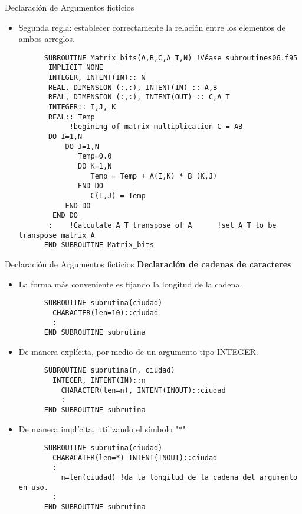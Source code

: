 \begin{frame}[fragile]{Declaración de Argumentos ficticios}
 \begin{itemize}[<+(0)->]
 \item Segunda regla: establecer correctamente la relación entre los elementos de ambos arreglos.
  \vspace{0.15cm}
      \begin{verbatim}
      SUBROUTINE Matrix_bits(A,B,C,A_T,N) !Véase subroutines06.f95
       IMPLICIT NONE
       INTEGER, INTENT(IN):: N
       REAL, DIMENSION (:,:), INTENT(IN) :: A,B
       REAL, DIMENSION (:,:), INTENT(OUT) :: C,A_T
       INTEGER:: I,J, K
       REAL:: Temp
            !begining of matrix multiplication C = AB  
       DO I=1,N                         
           DO J=1,N
              Temp=0.0
              DO K=1,N
                 Temp = Temp + A(I,K) * B (K,J)
              END DO
                 C(I,J) = Temp
           END DO
        END DO
       :    !Calculate A_T transpose of A      !set A_T to be transpose matrix A
      END SUBROUTINE Matrix_bits
      \end{verbatim} 
 \end{itemize}
\end{frame} 

\begin{frame}[fragile]{Declaración de Argumentos ficticios}
\textbf{Declaración de cadenas de caracteres}
 \begin{itemize}[<+(1)->]
  \item La forma más conveniente es fijando la longitud de la cadena.
   \vspace{0.15cm}
      \begin{verbatim}
      SUBROUTINE subrutina(ciudad)
        CHARACTER(len=10)::ciudad
        :
      END SUBROUTINE subrutina
      \end{verbatim} 
  \item De manera explícita, por medio de un argumento tipo INTEGER.
     \vspace{0.15cm}
      \begin{verbatim}
      SUBROUTINE subrutina(n, ciudad)
        INTEGER, INTENT(IN)::n
          CHARACTER(len=n), INTENT(INOUT)::ciudad
          :
      END SUBROUTINE subrutina
      \end{verbatim} 
  \item De manera implícita, utilizando el símbolo "*"
     \vspace{0.15cm}
      \begin{verbatim}
      SUBROUTINE subrutina(ciudad)
        CHARACATER(len=*) INTENT(INOUT)::ciudad
        :
          n=len(ciudad) !da la longitud de la cadena del argumento en uso.
        :
      END SUBROUTINE subrutina
      \end{verbatim} 
 \end{itemize}
\end{frame}

